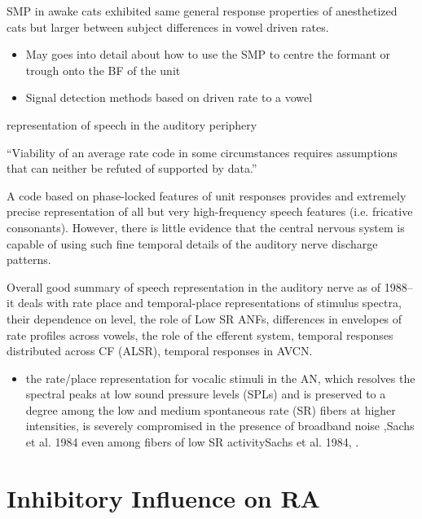 \documentclass[10pt,a4paper]{article}
\begin{document}
SMP in awake cats exhibited same general response properties of anesthetized
cats but larger between subject differences in vowel driven rates.


\begin{itemize}
\item May goes into detail about how to use the SMP to centre the formant or
  trough onto the BF of the unit
\item Signal detection methods based on driven rate to a vowel
\end{itemize}

\citep{SachsWinslowEtAl:1988} representation of speech in the auditory periphery

{\textquotedblleft}Viability of an average rate code in some circumstances
requires assumptions that can neither be refuted of supported by
data.{\textquotedblright}

A code based on phase-locked features of unit responses provides and extremely
precise representation of all but very high-frequency speech features
(i.e. fricative consonants).  However, there is little evidence that the central
nervous system is capable of using such fine temporal details of the auditory
nerve discharge patterns.

Overall good summary of speech representation in the auditory nerve as of 1988--
it deals with rate place and temporal-place representations of stimulus spectra,
their dependence on level, the role of Low SR ANFs, differences in envelopes of
rate profiles across vowels, the role of the efferent system, temporal responses
distributed across CF (ALSR), temporal responses in AVCN.

\citep{Geisler:1988}

\citep{RhodeGreenberg:1994b}


\begin{itemize}
\item the rate/place representation for vocalic stimuli in the AN, which
  resolves the spectral peaks at low sound pressure levels (SPLs) and is
  preserved to a degree among the low and medium spontaneous rate (SR) fibers at
  higher intensities, is severely compromised in the presence of broadband noise
  \citep{GeislerGamble:1989}{,Sachs et al. 1984} even among fibers of low SR
  activitySachs et al. 1984, \citep{SilkesGeisler:1991}.
\end{itemize}
\section{Inhibitory Influence on RA}
\citep{CasparyBackoffEtAl:1994}
\end{document}
